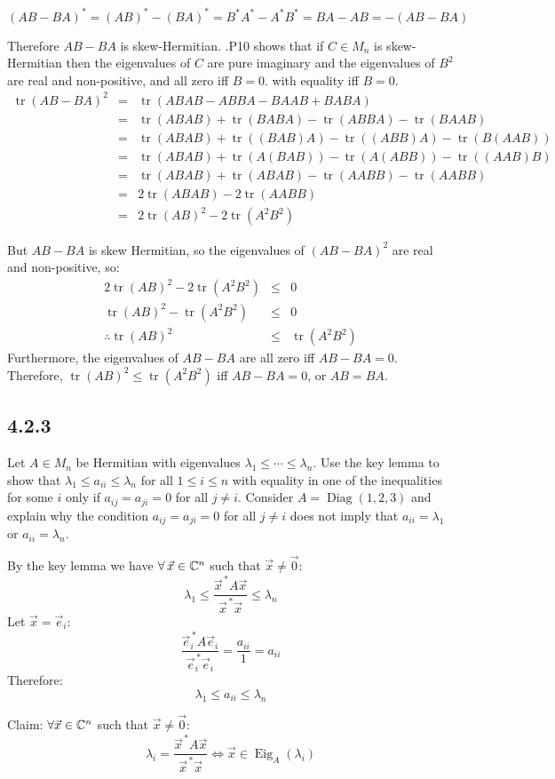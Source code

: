 \documentclass[letterpaper,12pt,fleqn]{article}
\renewcommand{\l}{\lambda}
\newcommand{\vx}{\vec{x}}
\newcommand{\vxct}{\vx^{\,*}}
\newcommand{\rr}{\frac{\vxct A\vx}{\vxct\vx}}
\newcommand{\ve}{\vec{e}}
\newcommand{\vz}{\vec{0}}
\DeclareMathOperator{\tr}{tr}
\DeclareMathOperator{\Eig}{Eig}
\DeclareMathOperator{\Diag}{Diag}
\begin{document}
$(AB-BA)^*=(AB)^*-(BA)^*=B^*A^*-A^*B^*=BA-AB=-(AB-BA)$

Therefore $AB-BA$ is skew-Hermitian.
.P10 shows that if $C\in M_n$ is skew-Hermitian then the eigenvalues of $C$ are
pure imaginary and the eigenvalues of $B^2$ are real and non-positive, and all zero iff
$B=0$.
with equality iff $B=0$.
\begin{eqnarray*}
  \tr(AB-BA)^2 &=& \tr(ABAB-ABBA-BAAB+BABA) \\
  &=& \tr(ABAB)+\tr(BABA)-\tr(ABBA)-\tr(BAAB) \\
  &=& \tr(ABAB)+\tr((BAB)A)-\tr((ABB)A)-\tr(B(AAB)) \\
  &=& \tr(ABAB)+\tr(A(BAB))-\tr(A(ABB))-\tr((AAB)B) \\
  &=& \tr(ABAB)+\tr(ABAB)-\tr(AABB)-\tr(AABB) \\
  &=& 2\tr(ABAB)-2\tr(AABB) \\
  &=& 2\tr(AB)^2-2\tr(A^2B^2)
\end{eqnarray*}

But $AB-BA$ is skew Hermitian, so the eigenvalues of $(AB-BA)^2$ are real and
non-positive, so:
\begin{eqnarray*}
  2\tr(AB)^2-2\tr(A^2B^2) &\le& 0 \\
  \tr(AB)^2-\tr(A^2B^2) &\le& 0 \\
  \therefore\tr(AB)^2 &\le& \tr(A^2B^2)
\end{eqnarray*}
Furthermore, the eigenvalues of $AB-BA$ are all zero iff $AB-BA=0$. Therefore,
$\tr(AB)^2\le\tr(A^2B^2)$ iff $AB-BA=0$, or $AB=BA$.

\subsection*{4.2.3}

Let $A\in M_n$ be Hermitian with eigenvalues $\l_1\le\cdots\le\l_n$. Use the key
lemma to show that $\l_1\le a_{ii}\le\l_n$ for all $1\le i\le n$ with equality in
one of the inequalities for some $i$ only if $a_{ij}=a_{ji}=0$ for all $j\ne i$.
Consider $A=\Diag(1,2,3)$ and explain why the condition $a_{ij}=a_{ji}=0$ for all
$j\ne i$ does not imply that $a_{ii}=\l_1$ or $a_{ii}=\l_n$.

By the key lemma we have $\forall\,\vx\in\C^n$ such that $\vx\ne\vz$:
\[\l_1\le\rr\le\l_n\]
Let $\vx=\ve_i$:
\[\frac{\ve_i^{\,*}A\ve_i}{\ve_i^{\,*}\ve_i}=\frac{a_{ii}}{1}=a_{ii}\]
Therefore:
\[\l_1\le a_{ii}\le\l_n\]

\newpage

Claim: $\forall\vx\in\C^n$ such that $\vx\ne\vz$:
\[\l_i=\rr\iff\vx\in\Eig_A(\l_i)\]
\end{document}
